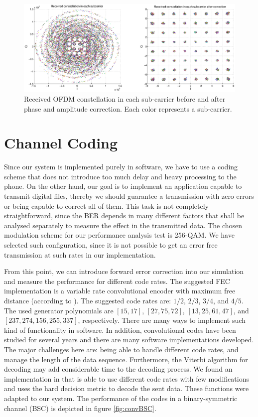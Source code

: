 \documentclass[12pt,a4paper,openright]{report}
\begin{document}
\begin{figure}[h]
  \centering
    \includegraphics[width=1\textwidth]{ofdm64const.eps}
    \caption[Received OFDM constellation in each sub-carrier.]{Received OFDM constellation in each sub-carrier before and after phase and amplitude correction. Each color represents a sub-carrier.}
    \label{fig:OFDMconst}
\end{figure}

\newpage
\section{Channel Coding}
\label{sec:ChanCodMethod}
Since our system is implemented purely in software, we have to use a coding scheme that does not introduce too much delay and heavy processing to the phone. On the other hand, our goal is to implement an application capable to transmit digital files, thereby we should guarantee a transmission with zero errors or being capable to correct all of them. This task is not completely straightforward, since the BER depends in many different factors that shall be analysed separately to measure the effect in the transmitted data. 
The chosen modulation scheme for our performance analysis test is 256-QAM. We have selected such configuration, since it is not possible to get an error free transmission at such rates in our implementation. 

From this point, we can introduce forward error correction into our simulation and measure the performance for different code rates. The suggested FEC implementation is a variable rate convolutional encoder with maximum free distance (according to \cite{Proakis}). The suggested code rates are: $1/2$, $2/3$, $3/4$, and $4/5$. The used generator polynomials are $[15,17]$, $[27,75,72]$, $[13,25,61,47]$, and $[237,274,156,255,337]$, respectively. There are many ways to implement such kind of functionality in software. In addition, convolutional codes have been studied for several years and there are many software implementations developed. The major challenges here are: being able to  handle different code rates, and manage the length of the data sequence. Furthermore, the Viterbi algorithm for decoding may add considerable time to the decoding process. We found an implementation in \cite{concodeSource} that is able to use different code rates with few modifications and uses the hard decision metric to decode the sent data. These functions were adapted to our system. The performance of the codes in a binary-symmetric channel (BSC) is depicted in figure \ref{fig:convBSC}.\\
\end{document}
